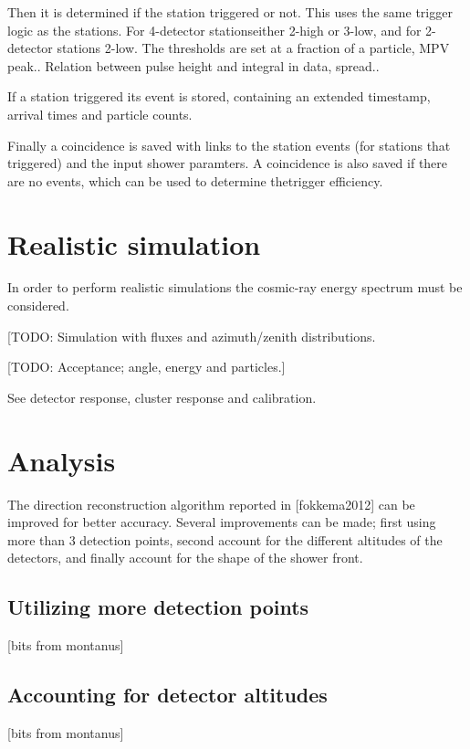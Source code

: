 Then it is determined if the station triggered or not. This uses the same trigger logic as the \hisparc stations. For 4-detector stationseither 2-high or 3-low, and for 2-detector stations 2-low. The thresholds are set at a fraction of a particle, MPV peak.. Relation between pulse height and integral in data, spread..

If a station triggered its event is stored, containing an extended timestamp, arrival times and particle counts.

Finally a coincidence is saved with links to the station events (for stations that triggered) and the input shower paramters. A coincidence is also saved if there are no events, which can be used to determine thetrigger efficiency.


\section{Realistic simulation}


In order to perform realistic simulations the cosmic-ray energy spectrum must be considered.

[TODO: Simulation with fluxes and azimuth/zenith distributions.

[TODO: Acceptance; angle, energy and particles.]

See detector response, cluster response and calibration.


\section{Analysis}

The direction reconstruction algorithm reported in [fokkema2012] can be improved for better accuracy. Several improvements can be made; first using more than 3 detection points, second account for the different altitudes of the detectors, and finally account for the shape of the shower front.


\subsection{Utilizing more detection points}

[bits from montanus]


\subsection{Accounting for detector altitudes}

[bits from montanus]


